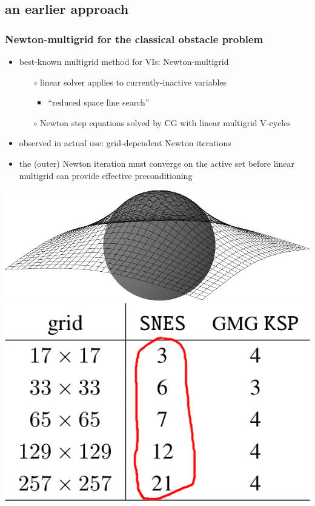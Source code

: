 \documentclass[svgnames,
               hyperref={colorlinks,citecolor=DeepPink4,linkcolor=FireBrick,urlcolor=Maroon},
               usepdftitle=false]  %
               {beamer}
\begin{document}
\subsection{an earlier approach}

\begin{frame}[fragile]
\frametitle{Newton-multigrid for the classical obstacle problem}

\begin{itemize}
\item best-known multigrid method for VIs: Newton-multigrid
    \begin{itemize}
    \item[$\circ$] linear solver applies to currently-inactive variables
        \begin{itemize}
        \item ``reduced space line search''
        \end{itemize}
    \item[$\circ$] Newton step equations solved by CG with linear multigrid V-cycles
    \end{itemize}
\item observed in actual use: grid-dependent Newton iterations
\item the (outer) Newton iteration must converge on the active set \alert{before} linear multigrid can provide effective preconditioning
\end{itemize}

\medskip
\includegraphics[height=0.15\textheight]{../talk-oxford/images/obstacle65.pdf} \qquad \includegraphics[height=0.25\textheight]{../talk-oxford/images/vi-newton-gmg-bad.png}
\end{frame}
\end{document}
